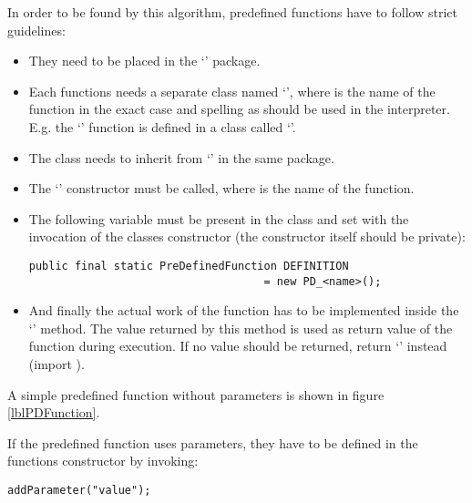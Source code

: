 In order to be found by this algorithm, predefined functions have to follow strict guidelines:

\begin{itemize}
	\item They need to be placed in the `' package.
	\item Each functions needs a separate class named `', where  is the name of the function in the exact case and spelling as should be used in the interpreter.\\
		E.g. the `' function is defined in a class called `'.
	\item The class needs to inherit from `' in the same package.
	\item The `' constructor must be called, where  is the name of the function.
	\item The following variable must be present in the class and set with the invocation of the classes constructor (the constructor itself should be private):
\begin{lstlisting}[frame=none,numbers=none]
public final static PreDefinedFunction DEFINITION
                                    = new PD_<name>();
\end{lstlisting}
	\item And finally the actual work of the function has to be implemented inside the `' method. The value returned by this method is used as return value of the function during execution. If no value should be returned, return `' instead (import ).

\end{itemize}

A simple predefined function without parameters is shown in figure \ref{lblPDFunction}.



If the predefined function uses parameters, they have to be defined in the functions constructor by invoking:
\begin{lstlisting}[frame=none,numbers=none]
addParameter("value");
\end{lstlisting}

